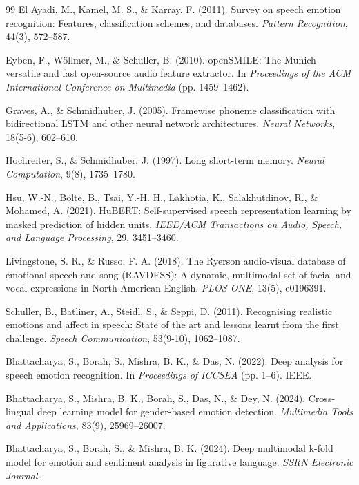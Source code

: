\documentclass[runningheads]{llncs}
\begin{document}
\begin{thebibliography}{99}
El Ayadi, M., Kamel, M. S., \& Karray, F. (2011).
Survey on speech emotion recognition: Features, classification schemes, and databases.
\textit{Pattern Recognition}, 44(3), 572--587.

Eyben, F., W{\"o}llmer, M., \& Schuller, B. (2010).
openSMILE: The Munich versatile and fast open-source audio feature extractor.
In \textit{Proceedings of the ACM International Conference on Multimedia} (pp. 1459--1462).

Graves, A., \& Schmidhuber, J. (2005).
Framewise phoneme classification with bidirectional LSTM and other neural network architectures.
\textit{Neural Networks}, 18(5-6), 602--610.

Hochreiter, S., \& Schmidhuber, J. (1997).
Long short-term memory.
\textit{Neural Computation}, 9(8), 1735--1780.

Hsu, W.-N., Bolte, B., Tsai, Y.-H. H., Lakhotia, K., Salakhutdinov, R., \& Mohamed, A. (2021).
HuBERT: Self-supervised speech representation learning by masked prediction of hidden units.
\textit{IEEE/ACM Transactions on Audio, Speech, and Language Processing}, 29, 3451--3460.

Livingstone, S. R., \& Russo, F. A. (2018).
The Ryerson audio-visual database of emotional speech and song (RAVDESS): A dynamic, multimodal set of facial and vocal expressions in North American English.
\textit{PLOS ONE}, 13(5), e0196391.

Schuller, B., Batliner, A., Steidl, S., \& Seppi, D. (2011).
Recognising realistic emotions and affect in speech: State of the art and lessons learnt from the first challenge.
\textit{Speech Communication}, 53(9-10), 1062--1087.

Bhattacharya, S., Borah, S., Mishra, B. K., \& Das, N. (2022).
Deep analysis for speech emotion recognition.
In \textit{Proceedings of ICCSEA} (pp. 1--6). IEEE.

Bhattacharya, S., Mishra, B. K., Borah, S., Das, N., \& Dey, N. (2024).
Cross-lingual deep learning model for gender-based emotion detection.
\textit{Multimedia Tools and Applications}, 83(9), 25969--26007.

Bhattacharya, S., Borah, S., \& Mishra, B. K. (2024).
Deep multimodal k-fold model for emotion and sentiment analysis in figurative language.
\textit{SSRN Electronic Journal}.


\end{thebibliography}
\end{document}
